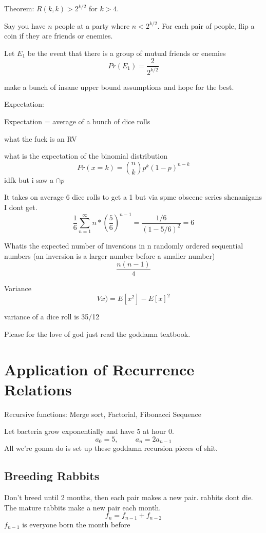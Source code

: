 \documentclass{report}
\begin{document}
Theorem: $R(k,k) > 2^{k/2}$ for $k > 4$.

Say you have $n$ people at a party where $n < 2^{k/2}$. For each pair of people, flip a coin if they are friends or enemies.

Let $E_1$ be the event that there is a group of mutual friends or enemies
\[
Pr(E_1) = \frac{2}{2^{k/2}}
\]

make a bunch of insane upper bound assumptions and hope for the best.


Expectation:

Expectation = average of a bunch of dice rolls


what the fuck is an RV


what is the expectation of the binomial distribution
\[
Pr(x=k) = {n \choose k} p^k (1-p)^{n-k}
\]
idfk but i saw a $\cap p$

It takes on average 6 dice rolls to get a 1 but via spme obscene series shenanigans I dont get.
\[
\frac{1}{6}\sum^\infty_{n=1}n*(\frac{5}{6})^{n-1} = \frac{1/6}{(1 - 5/6)^2} = 6
\]

Whatis the expected number of inversions in n randomly ordered sequential numbers (an inversion is a larger number before a smaller number)
\[
\frac{n(n-1)}{4}
\]

Variance
\[
Vx) = E[x^2] - E[x]^2
\]


variance of a dice roll is 35/12

Please for the love of god just read the goddamn textbook.



\chapter{Application of Recurrence Relations}
Recursive functions: Merge sort, Factorial, Fibonacci Sequence

Let bacteria grow exponentially and have 5 at hour 0.
\[
a_0 = 5, \hspace{1cm}
a_n = 2a_{n-1}
\]
 All we're gonna do is set up these goddamn recursion pieces of shit.
 
\section{Breeding Rabbits}
 
 Don't breed until 2 months, then each pair makes a new pair. rabbits dont die. The mature rabbits make a new pair each month.
 \[
 f_n = f_{n-1} + f_{n-2}
 \]
 $f_{n-1}$ is everyone born the month before
 
\end{document}
